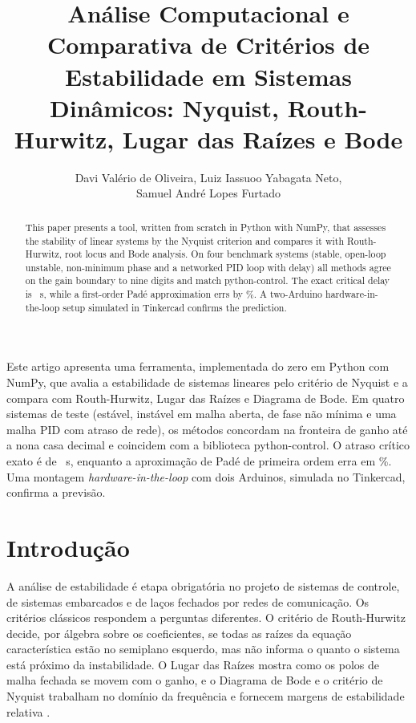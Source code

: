 \documentclass[12pt]{article}
\title{Análise Computacional e Comparativa de Critérios de Estabilidade em Sistemas Dinâmicos: Nyquist, Routh-Hurwitz, Lugar das Raízes e Bode}
\author{Davi Valério de Oliveira\inst{1}, Luiz Iassuoo Yabagata Neto\inst{1},\\ Samuel André Lopes Furtado\inst{1}}
\begin{document}
\maketitle

\begin{abstract}
  This paper presents a tool, written from scratch in Python with NumPy, that assesses the stability of linear systems by the Nyquist criterion and compares it with Routh-Hurwitz, root locus and Bode analysis. On four benchmark systems (stable, open-loop unstable, non-minimum phase and a networked PID loop with delay) all methods agree on the gain boundary to nine digits and match python-control. The exact critical delay is \TauCrit~s, while a first-order Padé approximation errs by \ErroPadeApct\%. A two-Arduino hardware-in-the-loop setup simulated in Tinkercad confirms the prediction.
\end{abstract}

\begin{resumo}
  Este artigo apresenta uma ferramenta, implementada do zero em Python com NumPy, que avalia a estabilidade de sistemas lineares pelo critério de Nyquist e a compara com Routh-Hurwitz, Lugar das Raízes e Diagrama de Bode. Em quatro sistemas de teste (estável, instável em malha aberta, de fase não mínima e uma malha PID com atraso de rede), os métodos concordam na fronteira de ganho até a nona casa decimal e coincidem com a biblioteca python-control. O atraso crítico exato é de \TauCrit~s, enquanto a aproximação de Padé de primeira ordem erra em \ErroPadeApct\%. Uma montagem \textit{hardware-in-the-loop} com dois Arduinos, simulada no Tinkercad, confirma a previsão.
\end{resumo}

\section{Introdução}

A análise de estabilidade é etapa obrigatória no projeto de sistemas de controle, de sistemas embarcados e de laços fechados por redes de comunicação. Os critérios clássicos respondem a perguntas diferentes. O critério de Routh-Hurwitz decide, por álgebra sobre os coeficientes, se todas as raízes da equação característica estão no semiplano esquerdo, mas não informa o quanto o sistema está próximo da instabilidade. O Lugar das Raízes mostra como os polos de malha fechada se movem com o ganho, e o Diagrama de Bode e o critério de Nyquist trabalham no domínio da frequência e fornecem margens de estabilidade relativa \cite{ogata2010,nise2017}.
\end{document}
